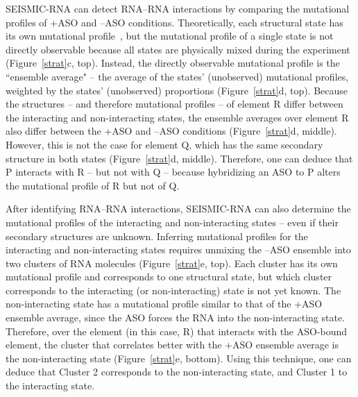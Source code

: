 \documentclass[main.tex]{subfiles}
\begin{document}
SEISMIC-RNA can detect RNA--RNA interactions by comparing the mutational profiles of +ASO and --ASO conditions.
Theoretically, each structural state has its own mutational profile~\cite{Sherpa2015}, but the mutational profile of a single state is not directly observable because all states are physically mixed during the experiment (Figure~\ref{strat}c, top).
Instead, the directly observable mutational profile is the ``ensemble average" -- the average of the states' (unobserved) mutational profiles, weighted by the states' (unobserved) proportions (Figure~\ref{strat}d, top).
Because the structures -- and therefore mutational profiles -- of element R differ between the interacting and non-interacting states, the ensemble averages over element R also differ between the +ASO and --ASO conditions (Figure~\ref{strat}d, middle).
However, this is not the case for element Q, which has the same secondary structure in both states (Figure~\ref{strat}d, middle).
Therefore, one can deduce that P interacts with R -- but not with Q -- because hybridizing an ASO to P alters the mutational profile of R but not of Q.

After identifying RNA--RNA interactions, SEISMIC-RNA can also determine the mutational profiles of the interacting and non-interacting states -- even if their secondary structures are unknown.
Inferring mutational profiles for the interacting and non-interacting states requires unmixing the --ASO ensemble into two clusters of RNA molecules (Figure~\ref{strat}e, top).
Each cluster has its own mutational profile and corresponds to one structural state, but which cluster corresponds to the interacting (or non-interacting) state is not yet known.
The non-interacting state has a mutational profile similar to that of the +ASO ensemble average, since the ASO forces the RNA into the non-interacting state.
Therefore, over the element (in this case, R) that interacts with the ASO-bound element, the cluster that correlates better with the +ASO ensemble average is the non-interacting state (Figure~\ref{strat}e, bottom).
Using this technique, one can deduce that Cluster 2 corresponds to the non-interacting state, and Cluster 1 to the interacting state.
\end{document}
